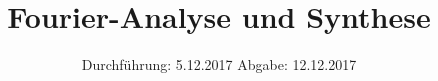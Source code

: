 

\subject{V351}
\title{Fourier-Analyse und Synthese}
\date{%
  Durchführung: 5.12.2017
  \hspace{3em}
  Abgabe: 12.12.2017
}



\maketitle
\thispagestyle{empty}
\tableofcontents
\newpage






\printbibliography{}


